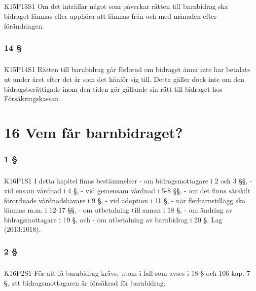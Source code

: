\documentclass[a4paper,notitlepage,openany,10pt]{book}
\begin{document}
\paragraph*{}
{\tiny K15P13S1}
Om det inträffar något som påverkar rätten till barnbidrag ska bidraget lämnas eller upphöra att lämnas från och med månaden efter förändringen.
\subsection*{14 §}
\paragraph*{}
{\tiny K15P14S1}
Rätten till barnbidrag går förlorad om bidraget ännu inte har betalats ut under året efter det år som det hänför sig till. Detta gäller dock inte om den bidragsberättigade inom den tiden gör gällande sin rätt till bidraget hos Försäkringskassan.
\chapter*{16 Vem får barnbidraget?}
\subsection*{1 §}
\paragraph*{}
{\tiny K16P1S1}
I detta kapitel finns bestämmelser
\newline - om bidragsmottagare i 2 och 3 §§,
\newline - vid ensam vårdnad i 4 §,
\newline - vid gemensam vårdnad i 5-8 §§,
\newline - om det finns särskilt förordnade vårdnadshavare i 9 §,
\newline - vid adoption i 11 §,
\newline - när flerbarnstillägg ska lämnas m.m. i 12-17 §§,
\newline - om utbetalning till annan i 18 §,
\newline - om ändring av bidragsmottagare i 19 §, och
\newline - om utbetalning av barnbidrag i 20 §.
Lag (2013:1018).
\subsection*{2 §}
\paragraph*{}
{\tiny K16P2S1}
För att få barnbidrag krävs, utom i fall som avses i 18 § och 106 kap. 7 §, att bidragsmottagaren är försäkrad för barnbidrag.
\end{document}
